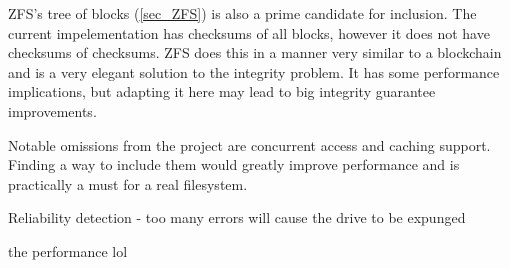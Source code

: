         ZFS's tree of blocks (\ref{sec_ZFS}) is also a prime candidate for
        inclusion. The current impelementation has checksums of all blocks,
        however it does not have checksums of checksums. ZFS does this in a
        manner very similar to a blockchain and is a very elegant solution to
        the integrity problem. It has some performance implications, but
        adapting it here may lead to big integrity guarantee improvements.

        Notable omissions from the project are concurrent access and caching
        support. Finding a way to include them would greatly improve
        performance and is practically a must for a real filesystem.

        Reliability detection - too many errors will cause the drive to be expunged

        the performance lol
